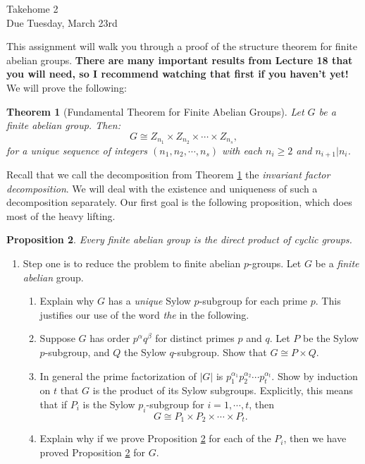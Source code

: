 \documentclass[11pt]{article}
\newtheorem{theorem}{Theorem}
\newtheorem{proposition}[theorem]{Proposition}
\begin{document}
\begin{center}
\Large {Takehome 2}\\
\small {Due Tuesday, March 23rd}
\end{center}
This assignment will walk you through a proof of the structure theorem for finite abelian groups.  \textbf{There are many important results from Lecture 18 that you will need, so I recommend watching that first if you haven't yet!}  We will prove the following:
\begin{theorem}[Fundamental Theorem for Finite Abelian Groups]\label{fundamental}
  Let $G$ be a finite abelian group.  Then:
  \[G\cong Z_{n_1}\times Z_{n_2}\times\cdots\times Z_{n_s},\]
  for a unique sequence of integers $(n_1,n_2,\cdots,n_s)$ with each $n_i\ge 2$ and $n_{i+1}|n_i$.
\end{theorem}
Recall that we call the decomposition from Theorem \ref{fundamental} the \textit{invariant factor decomposition}.  We will deal with the existence and uniqueness of such a decomposition separately.  Our first goal is the following proposition, which does most of the heavy lifting.
\begin{proposition}\label{main}
  Every finite abelian group is the direct product of cyclic groups.
\end{proposition}
\begin{enumerate}
  \item{
  Step one is to reduce the problem to finite abelian $p$-groups.  Let $G$ be a \textit{finite abelian} group.
  \begin{enumerate}
    \item{
    Explain why $G$ has a \textit{unique} Sylow $p$-subgroup for each prime $p$.  This justifies our use of the word \textit{the} in the following.
    }
    \item{
    Suppose $G$ has order $p^\alpha q^\beta$ for distinct primes $p$ and $q$.  Let $P$ be the Sylow $p$-subgroup, and $Q$ the Sylow $q$-subgroup.  Show that $G\cong P\times Q$.
    }
    \item{
    In general the prime factorization of $|G|$ is $p_1^{\alpha_1}p_2^{\alpha_2}\cdots p_t^{\alpha_t}$.  Show by induction on $t$ that $G$ is the product of its Sylow subgroups.  Explicitly, this means that if $P_i$ is the Sylow $p_i$-subgroup for $i= 1,\cdots,t$, then
    \[G\cong P_1\times P_2\times\cdots\times P_t.\]
    }
    \item{
    Explain why if we prove Proposition \ref{main} for each of the $P_i$, then we have proved Proposition \ref{main} for $G$.
    }
  \end{enumerate}
  }
\end{enumerate}
\end{document}
